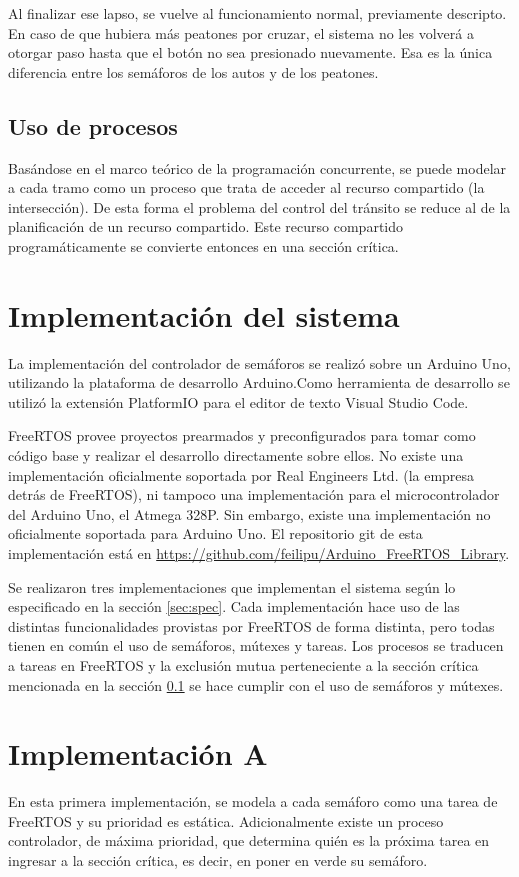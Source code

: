 Al finalizar ese lapso, se vuelve al funcionamiento normal, previamente descripto.
En caso de que hubiera más peatones por cruzar, el sistema no les volverá a otorgar paso hasta que el botón no sea presionado nuevamente.
Esa es la única diferencia entre los semáforos de los autos y de los peatones.

\subsection{Uso de procesos}\label{sec:proc}
Basándose en el marco teórico de la programación concurrente, se puede modelar a cada tramo como un proceso que trata de acceder al recurso compartido (la intersección). De esta forma el problema del control del tránsito se reduce al de la planificación de un recurso compartido. Este recurso compartido programáticamente se convierte entonces en una sección crítica.


\section{Implementación del sistema}
La implementación del controlador de semáforos se realizó sobre un Arduino Uno, utilizando la plataforma de desarrollo Arduino.Como herramienta de desarrollo se utilizó la extensión PlatformIO para el editor de texto Visual Studio Code.

FreeRTOS provee proyectos prearmados y preconfigurados para tomar como código base y realizar el desarrollo directamente sobre ellos. No existe una implementación oficialmente soportada por Real Engineers Ltd. (la empresa detrás de FreeRTOS), ni tampoco una implementación para el microcontrolador del Arduino Uno, el Atmega 328P. Sin embargo, existe una implementación no oficialmente soportada para Arduino Uno. El repositorio git de esta implementación está en \url{https://github.com/feilipu/Arduino\_FreeRTOS\_Library}.

Se realizaron tres implementaciones que implementan el sistema según lo especificado en la sección \ref{sec:spec}. Cada implementación hace uso de las distintas funcionalidades provistas por FreeRTOS de forma distinta, pero todas tienen en común el uso de semáforos, mútexes y tareas. Los procesos se traducen a tareas en FreeRTOS y la exclusión mutua perteneciente a la sección crítica mencionada en la sección \ref{sec:proc} se hace cumplir con el uso de semáforos y mútexes.



\section{Implementación A}
En esta primera implementación, se modela a cada semáforo como una tarea de FreeRTOS y su prioridad es estática.
Adicionalmente existe un proceso controlador, de máxima prioridad, que determina quién es la próxima tarea en ingresar a la sección crítica, es decir, en poner en verde su semáforo.

